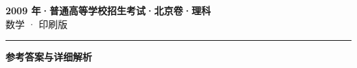 \documentclass[zihao=5, a4paper]{ctexart}
\begin{document}
\begin{center}
  {\Large\bfseries 2009 年·普通高等学校招生考试·北京卷·理科}\\[4pt]
  {\large 数学 · 印刷版}
\end{center}
\medskip
{}

\par\bigskip\hrule\bigskip
{}
\begin{center}{\large\bfseries 参考答案与详细解析}\end{center}
\smallskip

\end{document}
